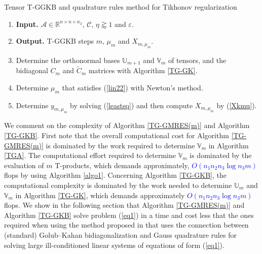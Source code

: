 \documentclass{siamltex}
\newcommand{\1}{\mathbb{1}}
\newcommand{\0}{\mathbb{0}}
\begin{document}
	\begin{algorithm}[!h]
		\caption{ Tensor T-GGKB and quadrature rules method for Tikhonov regularization}\label{TG-GKB}
		\begin{enumerate}
			\item {\bf Input.} $\mathscr{A}\in \mathbb{R}^{n\times n \times n_3}$,  $\mathscr {C}$, $\eta\gtrapprox 1$  and  $\varepsilon$.
			\item {\bf Output.} T-GGKB steps $m$, $\mu_{m}$ and $X_{m,\mu_m}$.
			\item Determine the orthonormal bases $\mathbb{U}_{m+1}$ and $\mathbb{V}_{m}$ of tensors, and the bidiagonal $C_m$ and $\widetilde{C}_m$
			matrices  with Algorithm \ref{TG-GK}.
			\item Determine $\mu_{m}$ that satisfies (\ref{lin22}) with Newton's method.
			\item  Determine $y_{m,\mu_m}$ by solving  (\ref{leastsq}) and then compute $X_{m,\mu_m}$ by (\ref{Xkmu}).
		\end{enumerate}
		
	\end{algorithm}
\noindent We comment on the complexity of Algorithm \ref{TG-GMRES(m)} and Algorithm \ref{TG-GKB}. First note that the overall computational cost for Algorithm \ref{TG-GMRES(m)} is dominated by the work required to determine $\mathbb{V}_{m}$   in Algorithm \ref{TGA}. The computational effort required to determine $\mathbb{V}_{m}$ is dominated by the evaluation of $m$  T-products, which demands approximately,   \textcolor{blue}{$O\left(n_1 n_2 n_3 \log n_3 m\right )$} flops  by using Algorithm \ref{algo1}.
	Concerning  Algorithm \ref{TG-GKB}, the  computational complexity is dominated by the work needed  to determine $\mathbb{U}_{m}$ and $\mathbb{V}_{m}$ in Algorithm \ref{TG-GK},  which demands approximately \textcolor{blue}{$O\left(n_1 n_2 n_3 \log n_3 m\right )$}  flops. We show in the following section that  Algorithm \ref{TG-GMRES(m)} and Algorithm \ref{TG-GKB} solve problem (\ref{eq1}) in a time and cost  less that the ones required when using the method 
	proposed in \cite{CR} that uses the connection between (standard) 
	Golub--Kahan bidiagonalization and Gauss quadrature rules for solving large 
	ill-conditioned linear systems of equations of form (\ref{eq1}).
\end{document}
